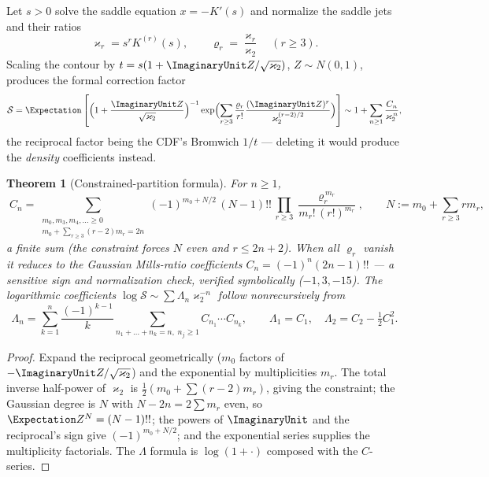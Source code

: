 \documentclass[11pt,oneside]{article}
\numberwithin{equation}{section}
\newtheorem{theorem}{Theorem}[section]
\theoremstyle{definition}
\theoremstyle{remark}
\begin{document}
Let $s>0$ solve the saddle equation $x=-K'(s)$ and normalize the
saddle jets and their ratios
\begin{equation}
 \varkappa_r=s^{r}K^{(r)}(s),
 \qquad
 \varrho_r=\frac{\varkappa_r}{\varkappa_2}
 \quad(r\ge3).
 \label{eq:saddle-jets}
\end{equation}
Scaling the contour by $t=s(1+\ImaginaryUnit Z/\sqrt{\varkappa_2})$,
$Z\sim N(0,1)$, produces the formal correction factor
\begin{equation}
 \mathcal S=\Expectation\left[
 \Bigl(1+\frac{\ImaginaryUnit Z}{\sqrt{\varkappa_2}}\Bigr)^{-1}
 \exp\Bigl(\sum_{r\ge3}\frac{\varrho_r}{r!}
 \frac{(\ImaginaryUnit Z)^{r}}{\varkappa_2^{(r-2)/2}}\Bigr)
 \right]
 \sim1+\sum_{n\ge1}\frac{C_n}{\varkappa_2^{\,n}},
 \label{eq:S-def}
\end{equation}
the reciprocal factor being the CDF's Bromwich $1/t$ --- deleting it
would produce the \emph{density} coefficients instead.

\begin{theorem}[Constrained-partition formula]
\label{thm:Cn}
For $n\ge1$,
\begin{equation}
 \boxed{\;
 C_n=\sum_{\substack{m_0,m_3,m_4,\dots\ge0\\
 m_0+\sum_{r\ge3}(r-2)m_r=2n}}
 (-1)^{m_0+N/2}\,(N-1)!!\,
 \prod_{r\ge3}\frac{\varrho_r^{\,m_r}}{m_r!\,(r!)^{m_r}},
 \qquad
 N:=m_0+\sum_{r\ge3}rm_r,
 \;}
 \label{eq:Cn-partition}
\end{equation}
a finite sum (the constraint forces $N$ even and $r\le2n+2$).  When
all $\varrho_r$ vanish it reduces to the Gaussian Mills-ratio
coefficients $C_n=(-1)^{n}(2n-1)!!$ --- a sensitive sign and
normalization check, verified symbolically ($-1,3,-15$).  The
logarithmic coefficients
$\log\mathcal S\sim\sum\Lambda_n\varkappa_2^{-n}$ follow
nonrecursively from
\begin{equation}
 \Lambda_n=\sum_{k=1}^{n}\frac{(-1)^{k-1}}k
 \sum_{n_1+\dots+n_k=n,\;n_j\ge1}
 C_{n_1}\cdots C_{n_k},
 \qquad
 \Lambda_1=C_1,\quad
 \Lambda_2=C_2-\tfrac12C_1^{2}.
 \label{eq:Lambda}
\end{equation}
\end{theorem}

\begin{proof}
Expand the reciprocal geometrically ($m_0$ factors of
$-\ImaginaryUnit Z/\sqrt{\varkappa_2}$) and the exponential by multiplicities
$m_r$.  The total inverse half-power of $\varkappa_2$ is
$\tfrac12(m_0+\sum(r-2)m_r)$, giving the constraint; the Gaussian
degree is $N$ with $N-2n=2\sum m_r$ even, so
$\Expectation Z^{N}=(N-1)!!$; the powers of $\ImaginaryUnit$ and the reciprocal's sign
give $(-1)^{m_0+N/2}$; and the exponential series supplies the
multiplicity factorials.  The $\Lambda$ formula is
$\log(1+\cdot)$ composed with the $C$-series.
\end{proof}
\end{document}
